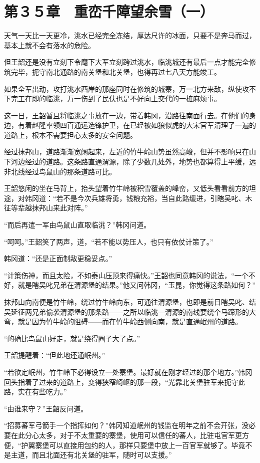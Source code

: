 \section{第３５章　重峦千障望余雪（一）}

天气一天比一天更冷，洮水已经完全冻结，厚达尺许的冰面，只要不是奔马而过，基本上就不会有落水的危险。

但王韶还是没有立刻下令麾下大军立刻跨过洮水，临洮城还有最后一点才能完全修筑完毕，扼守南北通路的南关堡和北关堡，也得再过七八天方能竣工。

如果全军出动，攻打洮水西岸的那座同时在修筑的城寨，万一北方来敌，纵使攻不下完工在即的临洮，万一伤到了民伕也是不好向上交代的一桩麻烦事。

这一日，王韶暂且将临洮之事放在一边，带着韩冈，沿路往南面行去。在他们的身边，有着赵隆率领四百通远选锋护卫，在已经被如狼似虎的大宋官军清理了一遍的道路上，根本不需要担心太多的安全问题。

经过抹邦山，道路渐渐宽阔起来，左近的竹牛岭山势虽然高峻，但并不影响只在山下河边经过的道路。这条路直通渭源，除了少数几处外，地势也都算得上平缓，远非北线经过鸟鼠山的那条道路可比。

王韶悠闲的坐在马背上，抬头望着竹牛岭被积雪覆盖的峰峦，又低头看看前方的坦途，对韩冈道：“若不是今次兵雄将勇，钱粮充裕，当自此路缓进，引瞎吴叱、木征等辈越抹邦山来此对阵。”

“而后再遣一军由鸟鼠山直取临洮？”韩冈问道。

“呵呵。”王韶笑了两声，道，“若不能以势压人，也只有依仗计策了。”

韩冈道：“还是正面制敌更稳妥点。”

“计策伤神，而且太险，不如泰山压顶来得痛快。”王韶也同意韩冈的说法，“一个不好，就是瞎吴叱兄弟在渭源堡的结果。”他又问韩冈，“玉昆，你觉得这条路如何？”

抹邦山向南便是竹牛岭，绕过竹牛岭向东，可通往渭源堡，也即是前日瞎吴叱、结吴延征两兄弟偷袭渭源堡的那条路——之所以临洮—渭源的南线要绕个马蹄形的大弯，就是因为竹牛岭的阻碍——而在竹牛岭西侧向南，就是直通岷州的道路。

“的确比鸟鼠山好走，就是绕得圈子大了点。”

王韶提醒着：“但此地还通岷州。”

“若欲定岷州，竹牛岭下必得设立一处寨堡。最好就在刚才经过的那个地方。”韩冈回头指着了过来的道路上，变得狭窄崎岖的那一段，“光靠北关堡驻军来扼守此路，实在有些吃力。”

“由谁来守？”王韶反问道。

“招募蕃军弓箭手一个指挥如何？”韩冈知道岷州的钱监在明年之前不会开张，没必要在此分心太多，对于不太重要的寨堡，使用可以信任的蕃人，比驻屯官军更方便，“护翼寨堡可以直接用包约的人，那样只要堡中放上一百官军就够了。毕竟不是主道，而且北面还有北关堡的驻军，随时可以支援。”

